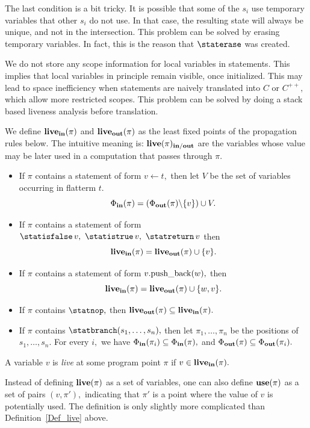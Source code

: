 The last condition is a bit tricky.
It is possible that some of the $ s_i $ use temporary
variables that other $ s_i $ do not use.
In that case, the resulting state will always be unique,
and not in the intersection. This problem can be solved by
erasing temporary variables. In fact, this is the reason
that $ \staterase $ was created.

We do not store any scope
information for local variables in statements.
This implies that local variables
in principle remain visible, once initialized.
This may lead to
space inefficiency when statements are naively translated into $ C $ or
$ C^{++}, $ which allow more restricted scopes. This
problem can be solved by
doing a stack based liveness analysis before translation.
\begin{definition}
   \label{Def_live}
   We define $ {\bf live}_{\bf in}(\pi) $ and
   $ {\bf live}_{\bf out}(\pi) $ as the least
   fixed points of the propagation rules below. The intuitive
   meaning is: $ {\bf live}(\pi)_{\bf in/out} $ are
   the variables whose value may be later used in a computation
   that passes through $ \pi. $
   \begin{itemize}
   \item
      If $ \pi $ contains a statement of form
      $ v \leftarrow t, $ then let $ V $ be the
      set of variables occurring in flatterm $ t. $
      \[ \Phi_{\bf in}(\pi) =
         ( \Phi_{\bf out}(\pi) \backslash \{ v \} ) \cup V. \]
   \item
      If $ \pi $ contains a statement of form
      $ \statisfalse \, v, \ \statistrue \, v, \ \statreturn \, v $
      then
      \[ {\bf live}_{\bf in}( \pi ) =
                {\bf live}_{\bf out}( \pi ) \cup \{ v \}. \]

   \item
      If $ \pi $ contains a statement of form
      $ v. {\rm push\_back}( w ), $ then
      \[ {\bf live}_{\bf in}(\pi) = {\bf live}_{\bf out}(\pi) \cup
              \{ w, v \}. \]
   \item
      If $ \pi $ contains $ \statnop, $ then
      $ {\bf live}_{\bf out}( \pi ) \subseteq {\bf live}_{\bf in} ( \pi ). $
   \item
      If $ \pi $ contains $ \statbranch( s_1, \ldots, s_n ), $
      then let $ \pi_1, \ldots, \pi_n $ be the positions of
      $ s_1, \ldots, s_n. $
      For every $ i, $ we have
      $ \Phi_{\bf in}(\pi_i) \subseteq \Phi_{\bf in}( \pi ), $ and
      $ \Phi_{\bf out}( \pi ) \subseteq \Phi_{\bf out}(\pi_i). $

   \end{itemize}
  A variable $ v $ is \emph{live} at some program point $ \pi $
   if $ v \in {\bf live}_{\bf in}(\pi). $
\end{definition}
Instead of defining $ {\bf live}(\pi) $ as a set of variables, one can also
define $ {\bf use}(\pi) $ as a set of pairs $ ( v, \pi'), $
indicating that $ \pi' $ is a point where the value of $ v $ is potentially used.
The definition is only slightly more complicated than Definition~\ref{Def_live} above.

